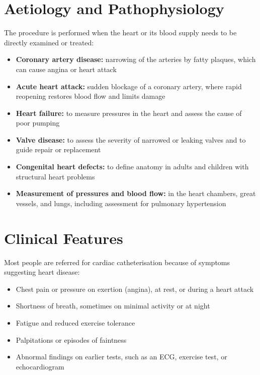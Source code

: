 \section*{Aetiology and Pathophysiology}
The procedure is performed when the heart or its blood supply needs to be directly examined or treated:
\begin{itemize}
    \item \textbf{Coronary artery disease:} narrowing of the arteries by fatty plaques, which can cause angina or heart attack
    \item \textbf{Acute heart attack:} sudden blockage of a coronary artery, where rapid reopening restores blood flow and limits damage
    \item \textbf{Heart failure:} to measure pressures in the heart and assess the cause of poor pumping
    \item \textbf{Valve disease:} to assess the severity of narrowed or leaking valves and to guide repair or replacement
    \item \textbf{Congenital heart defects:} to define anatomy in adults and children with structural heart problems
    \item \textbf{Measurement of pressures and blood flow:} in the heart chambers, great vessels, and lungs, including assessment for pulmonary hypertension
\end{itemize}

\section*{Clinical Features}
Most people are referred for cardiac catheterisation because of symptoms suggesting heart disease:
\begin{itemize}
    \item Chest pain or pressure on exertion (angina), at rest, or during a heart attack
    \item Shortness of breath, sometimes on minimal activity or at night
    \item Fatigue and reduced exercise tolerance
    \item Palpitations or episodes of faintness
    \item Abnormal findings on earlier tests, such as an ECG, exercise test, or echocardiogram
\end{itemize}

